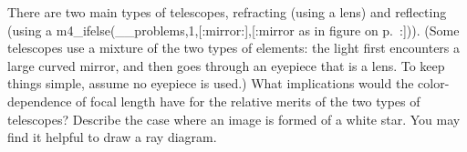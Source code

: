 There are two main types of telescopes, refracting (using
a lens) and reflecting (using a m4_ifelse(__problems,1,[:mirror:],[:mirror as in figure 
on p.~\pageref{fig:newtonian-telescope-eye}:])). (Some telescopes
use a mixture of the two types of elements: the light first
encounters a large curved mirror, and then goes through an
eyepiece that is a lens. To keep things simple, assume no eyepiece is used.) What implications would the
color-dependence of focal length have for the relative
merits of the two types of telescopes? Describe the case
where an image is formed of a white star. You may find
it helpful to draw a ray diagram.

